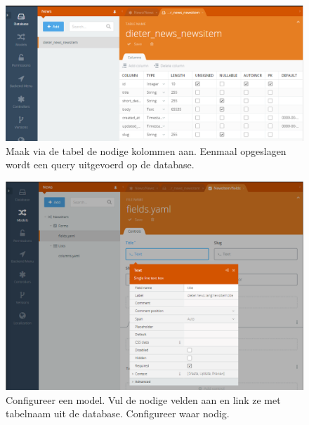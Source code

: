 \begin{figure}[!ht]
  \includegraphics[width=140mm]{img/oc-builder-db.png}
  \centering
  \caption{Maak via de tabel de nodige kolommen aan. Eenmaal opgeslagen wordt een query uitgevoerd op de database.}
  \label{fig:Builder Plugin, Database tabel aanmaken}
\end{figure}

\begin{figure}[!ht]
  \includegraphics[width=140mm]{img/oc-builder-model.png}
  \centering
  \caption{Configureer een model. Vul de nodige velden aan en link ze met tabelnaam uit de database. Configureer waar nodig.}
  \label{fig:Builder plugin, model aanmaken}
\end{figure}

